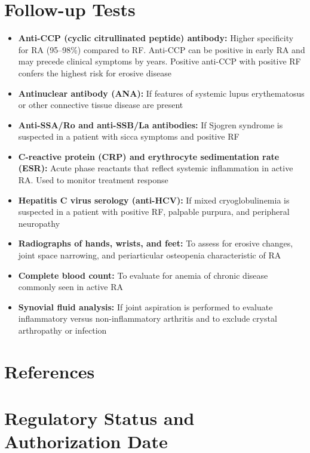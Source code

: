 \section*{Follow-up Tests}
\begin{itemize}
  \item \textbf{Anti-CCP (cyclic citrullinated peptide) antibody:} Higher specificity for RA (95--98\%) compared to RF. Anti-CCP can be positive in early RA and may precede clinical symptoms by years. Positive anti-CCP with positive RF confers the highest risk for erosive disease \cite{niewold2007anticcp}
  \item \textbf{Antinuclear antibody (ANA):} If features of systemic lupus erythematosus or other connective tissue disease are present
  \item \textbf{Anti-SSA/Ro and anti-SSB/La antibodies:} If Sjogren syndrome is suspected in a patient with sicca symptoms and positive RF
  \item \textbf{C-reactive protein (CRP) and erythrocyte sedimentation rate (ESR):} Acute phase reactants that reflect systemic inflammation in active RA. Used to monitor treatment response
  \item \textbf{Hepatitis C virus serology (anti-HCV):} If mixed cryoglobulinemia is suspected in a patient with positive RF, palpable purpura, and peripheral neuropathy
  \item \textbf{Radiographs of hands, wrists, and feet:} To assess for erosive changes, joint space narrowing, and periarticular osteopenia characteristic of RA
  \item \textbf{Complete blood count:} To evaluate for anemia of chronic disease commonly seen in active RA
  \item \textbf{Synovial fluid analysis:} If joint aspiration is performed to evaluate inflammatory versus non-inflammatory arthritis and to exclude crystal arthropathy or infection
\end{itemize}

\section*{References}



\clearpage
\section*{Regulatory Status and Authorization Date}

\clearpage
